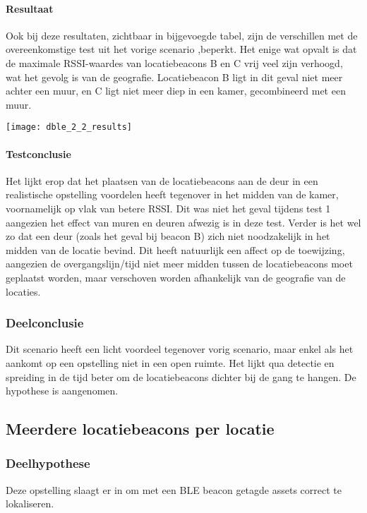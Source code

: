 \paragraph{Resultaat}
\begin{minipage}{0.42\textwidth}
Ook bij deze resultaten, zichtbaar in bijgevoegde tabel, zijn de verschillen met de overeenkomstige test uit het vorige scenario ,beperkt. Het enige wat opvalt is dat de maximale RSSI-waardes van locatiebeacons B en C vrij veel zijn verhoogd, wat het gevolg is van de geografie. Locatiebeacon B ligt in dit geval niet meer achter een muur, en C ligt niet meer diep in een kamer, gecombineerd met een muur. 
\end{minipage}
\hfill
\begin{minipage}{0.55\textwidth}
	\texttt{[image: dble\_2\_2\_results]}
\end{minipage}

\paragraph{Testconclusie}
Het lijkt erop dat het plaatsen van de locatiebeacons aan de deur in een realistische opstelling voordelen heeft tegenover in het midden van de kamer, voornamelijk op vlak van betere RSSI. Dit was niet het geval tijdens test 1 aangezien het effect van muren en deuren afwezig is in deze test. Verder is het wel zo dat een deur (zoals het geval bij beacon B) zich niet noodzakelijk in het midden van de locatie bevind. Dit heeft natuurlijk een affect op de toewijzing, aangezien de overgangslijn/tijd niet meer midden tussen de locatiebeacons moet geplaatst worden, maar verschoven worden afhankelijk van de geografie van de locaties.

\subsubsection{Deelconclusie}
Dit scenario heeft een licht voordeel tegenover vorig scenario, maar enkel als het aankomt op een opstelling niet in een open ruimte. Het lijkt qua detectie en spreiding in de tijd beter om de locatiebeacons dichter bij de gang te hangen. De hypothese is aangenomen.

\subsection{Meerdere locatiebeacons per locatie}
\subsubsection{Deelhypothese}
Deze opstelling slaagt er in om met een BLE beacon getagde assets correct te lokaliseren.

